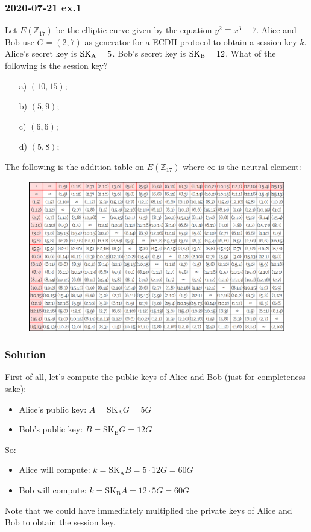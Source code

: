 \documentclass[11pt, a4paper]{article}
\begin{document}
\subsubsection{2020-07-21 ex.1}
Let $E(\mathbb{Z}_{17})$ be the elliptic curve given by the equation $y^2\equiv x^3+7$. Alice and Bob use $G=(2,7)$ as generator for a ECDH protocol to obtain a session key $k$. Alice's secret key is $\text{SK}_{\text A}=5$. Bob's secret key is $\text{SK}_{\text B}=12$. What of the following is the session key?
\begin{itemize}
    \item[a)] $(10,15)$;
    \item[b)] $(5,9)$;
    \item[c)] $(6,6)$;
    \item[d)] $(5,8)$;
\end{itemize}
The following is the addition table on $E(\mathbb{Z}_{17})$ where $\infty$ is the neutral element:
\begin{figure}[H]
    \centering
    \includegraphics[scale=0.55]{immagini/EC/2.png}
\end{figure}

\subsubsection*{Solution}
First of all, let's compute the public keys of Alice and Bob (just for completeness sake):
\begin{itemize}
    \item Alice's public key: $A=\text{SK}_{\text{A}}G=5G$
    \item Bob's public key: $B=\text{SK}_{\text{B}}G=12G$
\end{itemize}
So:
\begin{itemize}
    \item Alice will compute: $k=\text{SK}_{\text{A}}B=5\cdot12G=60G$
    \item Bob will compute: $k=\text{SK}_{\text{B}}A=12\cdot5G=60G$
\end{itemize}
Note that we could have immediately multiplied the private keys of Alice and Bob to obtain the session key.
\end{document}
